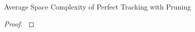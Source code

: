 \begin{theorem}{Average Space Complexity of Perfect Tracking with Pruning}
\label{thm:perfect-tracking-with-pruning-space}


\end{theorem}

\begin{proof}
\label{prf:perfect-tracking-with-pruning-space}

\end{proof}